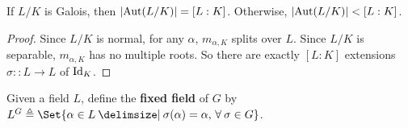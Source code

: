 \begin{theorem}
  If $L/K$ is Galois, then $\lvert\operatorname{Aut}(L/K)\rvert = [L:K]$. Otherwise, $\lvert\operatorname{Aut}(L/K)\rvert < [L:K]$.

  \begin{proof}
    Since $L/K$ is normal, for any $\alpha$, $m_{\alpha, K}$ splits over $L$.
    Since $L/K$ is separable, $m_{\alpha, K}$ has no multiple roots. So there are exactly $[L:K]$
    extensions $\sigma:: L \to L$ of ${\rm Id}_K$.
  \end{proof}
\end{theorem}

\begin{definition}
  Given a field $L$, define the {\bf fixed field} of $G$ by
  $L^G \triangleq \Set{ \alpha \in L \given \sigma(\alpha) = \alpha, \, \forall \sigma \in G }$.
\end{definition}

